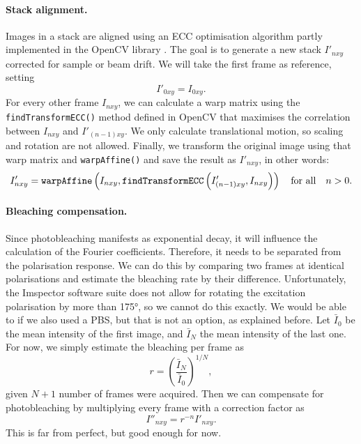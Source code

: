 \paragraph{Stack alignment.} Images in a stack are aligned using an ECC  optimisation algorithm partly implemented in the OpenCV library \cite{Evangelidis2008}. The goal is to generate a new stack $ I'_{nxy} $ corrected for sample or beam drift. We will take the first frame as reference, setting 
\begin{equation}
	I'_{0xy} = I_{0xy}.
\end{equation}
For every other frame $ I_{nxy} $, we can calculate a warp matrix using the \texttt{findTransformECC()} method defined in OpenCV that maximises the correlation between $ I_{nxy} $ and $ I'_{(n-1)xy} $. We only calculate translational motion, so scaling and rotation are not allowed. Finally, we transform the original image using that warp matrix and \texttt{warpAffine()} and save the result as $ I'_{nxy} $, in other words:
\begin{equation}
	I'_{nxy} = \texttt{warpAffine}\left(
		I_{nxy}, 
		\texttt{findTransformECC}\left(I'_{(n-1)xy}, I_{nxy}\right)
	\right) \qq{for all} n>0.
\end{equation}

\paragraph{Bleaching compensation.} Since photobleaching manifests as exponential decay, it will influence the calculation of the Fourier coefficients. Therefore, it needs to be separated from the polarisation response. We can do this by comparing two frames at identical polarisations and estimate the bleaching rate by their difference. Unfortunately, the Imspector software suite does not allow for rotating the excitation polarisation by more than \ang{175}, so we cannot do this exactly. We would be able to if we also used a PBS, but that is not an option, as explained before. Let $ \bar{I}_0 $ be the mean intensity of the first image, and $ \bar{I}_N $ the mean intensity of the last one. For now, we simply estimate the bleaching per frame as
\begin{equation}
	r = \left( \frac{\bar{I}_N}{\bar{I}_0} \right) ^{1/N},
\end{equation}
given $ N+1 $ number of frames were acquired. Then we can compensate for photobleaching by multiplying every frame with a correction factor as
\begin{equation}
	I''_{nxy} = r^{-n} I'_{nxy}.
\end{equation}
This is far from perfect, but good enough for now.

